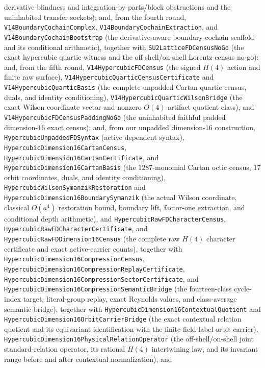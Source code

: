 \documentclass[11pt]{article}
\theoremstyle{definition}
\begin{document}
derivative-blindness and integration-by-parts/block obstructions and the
uninhabited transfer sockets); and, from the fourth round,
\texttt{V14BoundaryCochainComplex}, \texttt{V14BoundaryCochainExtraction}, and
\texttt{V14BoundaryCochainBootstrap} (the derivative-aware boundary-cochain
scaffold and its conditional arithmetic), together with
\texttt{SU2LatticeFDCensusNoGo} (the exact hypercubic quartic witness and the
off-shell/on-shell Lorentz-census no-go); and, from the fifth round,
\texttt{V14HypercubicFDCensus} (the signed $H(4)$ action and finite raw
surface), \texttt{V14HypercubicQuarticCensusCertificate} and
\texttt{V14HypercubicQuarticBasis} (the complete unpadded Cartan quartic
census, duals, and identity conditioning),
\texttt{V14HypercubicQuarticWilsonBridge} (the exact Wilson coordinate vector
and nonzero $O(4)$-artifact quotient class), and
\texttt{V14HypercubicFDCensusPaddingNoGo} (the uninhabited faithful padded
dimension-$16$ exact census); and, from our unpadded dimension-$16$
construction, \texttt{HypercubicUnpaddedFDSyntax} (active dependent syntax),
\texttt{HypercubicDimension16CartanCensus},
\texttt{HypercubicDimension16CartanCertificate}, and
\texttt{HypercubicDimension16CartanBasis} (the $1287$-monomial Cartan octic
census, $17$ orbit coordinates, duals, and identity conditioning),
\texttt{HypercubicWilsonSymanzikRestoration} and
\texttt{HypercubicDimension16BoundarySymanzik} (the actual Wilson coordinate,
classical $O(a^4)$ restoration bound, boundary lift, factor-one extraction,
and conditional depth arithmetic), and
\texttt{HypercubicRawFDCharacterCensus},
\texttt{HypercubicRawFDCharacterCertificate}, and
\texttt{HypercubicRawFDDimension16Census} (the complete raw $H(4)$ character
certificate and exact active-carrier counts), together with
\texttt{HypercubicDimension16CompressionCensus},
\texttt{HypercubicDimension16CompressionReplayCertificate},
\texttt{HypercubicDimension16CompressionSectorCertificate}, and
\texttt{HypercubicDimension16CompressionSemanticBridge} (the fourteen-class
cycle-index target, literal-group replay, exact Reynolds values, and
class-average semantic bridge), together with
\texttt{HypercubicDimension16ContextualQuotient} and
\texttt{HypercubicDimension16OrbitCarrierBridge} (the exact contextual
relation quotient and its equivariant identification with the finite
field-label orbit carrier),
\texttt{HypercubicDimension16PhysicalRelationOperator} (the off-shell/on-shell
joint standard-relation operator, its rational $H(4)$ intertwining law, and
its invariant range before and after contextual normalization), and
\end{document}
